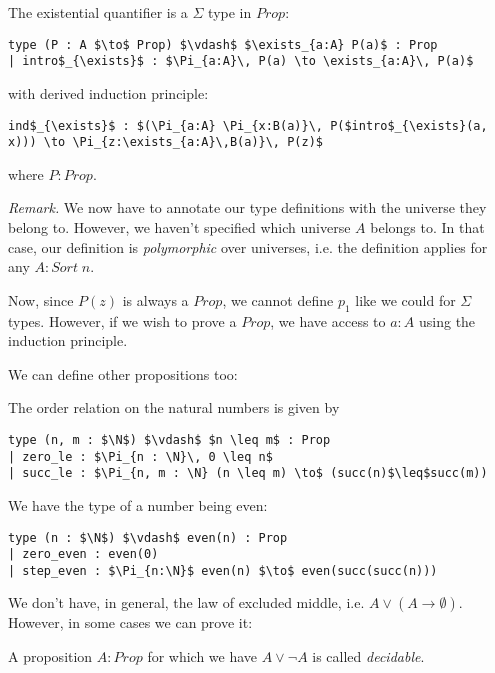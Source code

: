 \documentclass[a4paper, 12pt]{article}
\newcommand{\N}{\mathbb{N}}
\newcommand{\B}{\mathbb{B}}
\newcommand{\Prop}{\mathit{Prop}}
\newcommand{\Sort}{\mathit{Sort\;}}
\renewcommand{\Prop}{\mathit{Prop}}
\theoremstyle{changedot}
\theoremstyle{changedotbreak}
\theoremstyle{nonumberplain}
\begin{document}
\begin{definition}
  The existential quantifier is a $\Sigma$ type in $\Prop$:
\begin{lstlisting}
type (P : A $\to$ Prop) $\vdash$ $\exists_{a:A} P(a)$ : Prop
| intro$_{\exists}$ : $\Pi_{a:A}\, P(a) \to \exists_{a:A}\, P(a)$
\end{lstlisting}
  with derived induction principle:
\begin{lstlisting}
ind$_{\exists}$ : $(\Pi_{a:A} \Pi_{x:B(a)}\, P($intro$_{\exists}(a, x))) \to \Pi_{z:\exists_{a:A}\,B(a)}\, P(z)$
\end{lstlisting}
  where $P : \Prop$. 
\end{definition}
\textit{Remark.} We now have to annotate our type definitions with the universe they belong to. However, we haven't specified which universe $A$ belongs to. In that case, our definition is \textit{polymorphic} over universes, i.e. the definition applies for any $A : \Sort n$.

Now, since $P(z)$ is always a $\Prop$, we cannot define $p_{1}$ like we could for $\Sigma$ types. However, if we wish to prove a $\Prop$, we have access to $a:A$ using the induction principle.

We can define other propositions too:

\begin{definition}
  The order relation on the natural numbers is given by
\begin{lstlisting}
type (n, m : $\N$) $\vdash$ $n \leq m$ : Prop
| zero_le : $\Pi_{n : \N}\, 0 \leq n$
| succ_le : $\Pi_{n, m : \N} (n \leq m) \to$ (succ(n)$\leq$succ(m))
\end{lstlisting}
\end{definition}

\begin{definition}
  We have the type of a number being even:
\begin{lstlisting}
type (n : $\N$) $\vdash$ even(n) : Prop
| zero_even : even(0)
| step_even : $\Pi_{n:\N}$ even(n) $\to$ even(succ(succ(n)))
\end{lstlisting}
\end{definition}

We don't have, in general, the law of excluded middle, i.e. $A \lor (A \to \emptyset)$. However, in some cases we can prove it:
\begin{definition}
  A proposition $A : \Prop$ for which we have $A \lor \neg A$ is called \textit{decidable}.
\end{definition}
\end{document}
